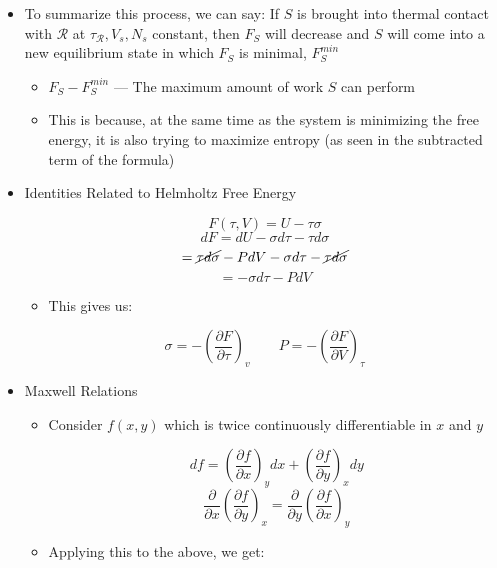 \begin{itemize}
\begin{itemize}
      \item To summarize this process, we can say: If $S$ is brought into thermal contact with $\mathcal{R}$ at $\tau_{\mathcal{R}},V_s,N_s$ constant, then $F_S$ will decrease and $S$ will come into a new equilibrium state in which $F_S$ is minimal, $F_S^{min}$

        \begin{itemize}

          \item $F_S-F_S^{min}$ — The maximum amount of work $S$ can perform

          \item This is because, at the same time as the system is minimizing the free energy, it is also trying to maximize entropy (as seen in the subtracted term of the formula)

        \end{itemize}

      \item Identities Related to Helmholtz Free Energy

        $$F(\tau,V)=U-\tau\sigma$$
        $$dF=dU-\sigma d\tau-\tau d\sigma$$
        $$=\cancel{\tau d\sigma}- PdV-\sigma d\tau-\cancel{\tau d\sigma}$$
        $$=-\sigma d\tau-PdV$$

        \begin{itemize}

          \item This gives us:

        \end{itemize}

        $$\sigma=-\left( \frac{\partial F}{\partial \tau} \right)_v\quad\quad P=-\left( \frac{\partial F}{\partial V} \right)_{\tau}$$

      \item Maxwell Relations

        \begin{itemize}

          \item Consider $f(x,y)$ which is twice continuously differentiable in $x$ and $y$

            $$df=\left(\frac{\partial f}{\partial x}\right)_ydx+\left( \frac{\partial f}{\partial y} \right)_xdy$$
            $$\frac{\partial}{\partial x}\left( \frac{\partial f}{\partial y} \right)_x=\frac{\partial}{\partial y}\left( \frac{\partial f}{\partial x} \right)_y$$

          \item Applying this to the above, we get:


\end{itemize}
\end{itemize}
\end{itemize}
